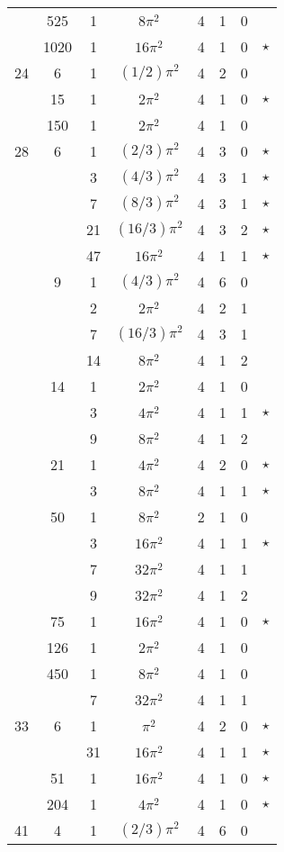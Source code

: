 \begin{tabular}{ccc|ccccc}
 & 525 & 1 & $8\pi^2$ & 4 & 1 & 0 &  \\
 & 1020 & 1 & $16\pi^2$ & 4 & 1 & 0 & $\star$ \\
24 & 6 & 1 & $(1/2)\pi^2$ & 4 & 2 & 0 &  \\
 & 15 & 1 & $2\pi^2$ & 4 & 1 & 0 & $\star$ \\
 & 150 & 1 & $2\pi^2$ & 4 & 1 & 0 &  \\
28 & 6 & 1 & $(2/3)\pi^2$ & 4 & 3 & 0 & $\star$ \\
 &  & 3 & $(4/3)\pi^2$ & 4 & 3 & 1 & $\star$ \\
 &  & 7 & $(8/3)\pi^2$ & 4 & 3 & 1 & $\star$ \\
 &  & 21 & $(16/3)\pi^2$ & 4 & 3 & 2 & $\star$ \\
 &  & 47 & $16\pi^2$ & 4 & 1 & 1 & $\star$ \\
 & 9 & 1 & $(4/3)\pi^2$ & 4 & 6 & 0 &  \\
 &  & 2 & $2\pi^2$ & 4 & 2 & 1 &  \\
 &  & 7 & $(16/3)\pi^2$ & 4 & 3 & 1 &  \\
 &  & 14 & $8\pi^2$ & 4 & 1 & 2 &  \\
 & 14 & 1 & $2\pi^2$ & 4 & 1 & 0 &  \\
 &  & 3 & $4\pi^2$ & 4 & 1 & 1 & $\star$ \\
 &  & 9 & $8\pi^2$ & 4 & 1 & 2 &  \\
 & 21 & 1 & $4\pi^2$ & 4 & 2 & 0 & $\star$ \\
 &  & 3 & $8\pi^2$ & 4 & 1 & 1 & $\star$ \\
 & 50 & 1 & $8\pi^2$ & 2 & 1 & 0 &  \\
 &  & 3 & $16\pi^2$ & 4 & 1 & 1 & $\star$ \\
 &  & 7 & $32\pi^2$ & 4 & 1 & 1 &  \\
 &  & 9 & $32\pi^2$ & 4 & 1 & 2 &  \\
 & 75 & 1 & $16\pi^2$ & 4 & 1 & 0 & $\star$ \\
 & 126 & 1 & $2\pi^2$ & 4 & 1 & 0 &  \\
 & 450 & 1 & $8\pi^2$ & 4 & 1 & 0 &  \\
 &  & 7 & $32\pi^2$ & 4 & 1 & 1 &  \\
33 & 6 & 1 & $\pi^2$ & 4 & 2 & 0 & $\star$ \\
 &  & 31 & $16\pi^2$ & 4 & 1 & 1 & $\star$ \\
 & 51 & 1 & $16\pi^2$ & 4 & 1 & 0 & $\star$ \\
 & 204 & 1 & $4\pi^2$ & 4 & 1 & 0 & $\star$ \\
41 & 4 & 1 & $(2/3)\pi^2$ & 4 & 6 & 0 &  \\

\end{tabular}
